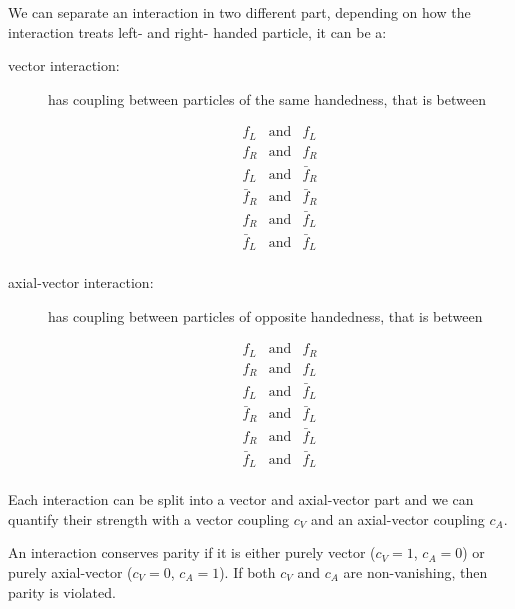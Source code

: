 \documentclass[12pt]{article}
\begin{document}
We can separate an interaction in two different part, depending on how the interaction treats left- and right- handed particle, it can be a: 
\begin{description}
\item[vector interaction: ] has coupling between particles of the same handedness, that is between 

\[\begin{array}{ccc}
f_L & \mbox{and} & f_L\\
f_R & \mbox{and}& f_R\\
f_L & \mbox{and}& \bar f_R\\
\bar f_R & \mbox{and}& \bar f_R\\
f_R & \mbox{and}& \bar f_L\\
\bar f_L & \mbox{and}& \bar f_L\\
\end{array}\]

\item[axial-vector interaction: ] has coupling between particles of opposite handedness, that is between 

\[\begin{array}{ccc}
f_L & \mbox{and} & f_R\\
f_R & \mbox{and}& f_L\\
f_L & \mbox{and}& \bar f_L\\
\bar f_R & \mbox{and}& \bar f_L\\
f_R & \mbox{and}& \bar f_L\\
\bar f_L & \mbox{and}& \bar f_L\\
\end{array}\]
\end{description}
Each interaction can be split into a vector and axial-vector part and we can quantify their strength with a vector coupling $c_V$ and an axial-vector coupling $c_A$. 

An interaction conserves parity if it is either purely vector ($c_V=1$, $c_A=0$) or purely axial-vector ($c_V=0$, $c_A=1$). If both $c_V$ and $c_A$ are non-vanishing, then parity is violated.  
\end{document}
